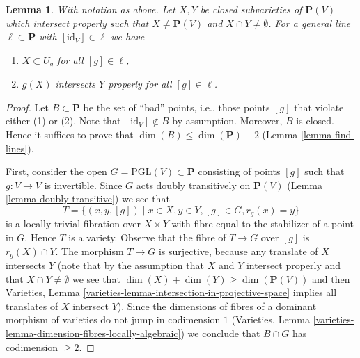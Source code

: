 \documentclass{stacks-project}
\theoremstyle{plain}
\newtheorem{lemma}[subsection]{Lemma}
\theoremstyle{definition}
\theoremstyle{remark}
\numberwithin{equation}{subsection}
\begin{document}
\begin{lemma}
\label{lemma-make-family}
With notation as above. Let $X, Y$ be closed subvarieties of $\mathbf{P}(V)$
which intersect properly such that $X \not = \mathbf{P}(V)$ and
$X \cap Y \not = \emptyset$. For a general line $\ell \subset \mathbf{P}$
with $[\text{id}_V] \in \ell$ we have
\begin{enumerate}
\item $X \subset U_g$ for all $[g] \in \ell$,
\item $g(X)$ intersects $Y$ properly for all $[g] \in \ell$.
\end{enumerate}
\end{lemma}

\begin{proof}
Let $B \subset \mathbf{P}$ be the set of ``bad'' points, i.e., those
points $[g]$ that violate either (1) or (2). Note that
$[\text{id}_V] \not \in B$ by assumption. Moreover, $B$ is closed.
Hence it suffices to prove that $\dim(B) \leq \dim(\mathbf{P}) - 2$
(Lemma \ref{lemma-find-lines}).

\medskip\noindent
First, consider the open $G = \text{PGL}(V) \subset \mathbf{P}$
consisting of points $[g]$ such that $g : V \to V$ is invertible.
Since $G$ acts doubly transitively on $\mathbf{P}(V)$
(Lemma \ref{lemma-doubly-transitive})
we see that
$$
T = \{(x, y, [g]) \mid x \in X, y \in Y, [g] \in G, r_g(x) = y\}
$$
is a locally trivial fibration over $X \times Y$ with fibre equal
to the stabilizer of a point in $G$. Hence $T$ is a variety.
Observe that the fibre of $T \to G$ over $[g]$ is $r_g(X) \cap Y$.
The morphism $T \to G$ is surjective, because any translate of $X$
intersects $Y$ (note that by the assumption that $X$ and $Y$ intersect
properly and that $X \cap Y \not = \emptyset$ we see that
$\dim(X) + \dim(Y) \geq \dim(\mathbf{P}(V))$ and then
Varieties, Lemma \ref{varieties-lemma-intersection-in-projective-space}
implies all translates of $X$ intersect $Y$).
Since the dimensions of fibres of a dominant morphism of varieties do
not jump in codimension $1$
(Varieties, Lemma \ref{varieties-lemma-dimension-fibres-locally-algebraic})
we conclude that $B \cap G$ has codimension $\geq 2$.


\end{proof}
\end{document}
